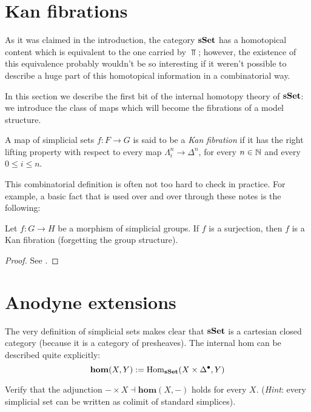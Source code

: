 \begin{refsection}
\section{Kan fibrations}

As it was claimed in the introduction, the category $\mathbf{s\,\!\mathbf{Set}}$ has a homotopical content which is equivalent to the one carried by $\Top$; however, the existence of this equivalence probably wouldn't be so interesting if it weren't possible to describe a huge part of this homotopical information in a combinatorial way.

In this section we describe the first bit of the internal homotopy theory of $\mathbf{s\,\!\mathbf{Set}}$: we introduce the class of maps which will become the fibrations of a model structure.

\begin{defin}
A map of simplicial sets $f \colon F \to G$ is said to be a \emph{Kan fibration} if it has the right lifting property with respect to every map $\Lambda^n_i \to \Delta^n$, for every $n \in \mathbb{N}$ and every $0 \le i \le n$.
\end{defin}

This combinatorial definition is often not too hard to check in practice. For example, a basic fact that is used over and over through these notes is the following:

\begin{lemma} \label{lemma group fibration}
Let $f \colon G \to H$ be a morphism of simplicial groups. If $f$ is a surjection, then $f$ is a Kan fibration (forgetting the group structure).
\end{lemma}

\begin{proof}
See \cite[Lemma 8.2.8]{weibel}.
\end{proof}

\section{Anodyne extensions}

The very definition of simplicial sets makes clear that $\mathbf{s\,\!\mathbf{Set}}$ is a cartesian closed category (because it is a category of presheaves). The internal hom can be described quite explicitly:
\[
\mathbf{hom}(X,Y) := \mathrm{Hom}_{\mathbf{s\,\!\mathbf{Set}}}(X \times \Delta^{\bullet}, Y)
\]

\begin{exercise}
Verify that the adjunction $- \times X \dashv \mathbf{hom}(X,-)$ holds for every $X$. (\emph{Hint}: every simplicial set can be written as colimit of standard simplices).
\end{exercise}


\end{refsection}
